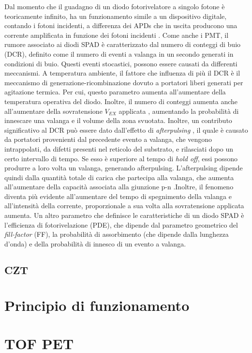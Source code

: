 Dal momento che il guadagno di un diodo fotorivelatore a singolo fotone è teoricamente infinito, ha un funzionamento simile a un dispositivo digitale, contando i fotoni incidenti, a differenza dei APDs che in uscita producono una corrente amplificata in funzione dei fotoni incidenti \cite{Jiang2019}. Come anche i PMT, il rumore associato ai diodi SPAD è caratterizzato dal numero di conteggi di buio (DCR), definito come il numero di eventi a valanga in un secondo generati in condizioni di buio. Questi eventi stocastici, possono essere causati da differenti meccanismi. A temperatura ambiente, il fattore che influenza di più il DCR è il meccanismo di generazione-ricombinazione dovuto a portatori liberi generati per agitazione termica. Per cui, questo parametro aumenta all'aumentare della temperatura operativa del diodo. Inoltre, il numero di conteggi aumenta anche all'aumentare della sovratensione $V_{EX}$ applicata \cite{DiFranco2002}, aumentando la probabilità di innescare una valanga e il volume della zona svuotata. Inoltre, un contributo significativo al DCR può essere dato dall'effetto di \textit{afterpulsing} \cite{DiFranco2002}, il quale è causato da portatori provenienti dal precedente evento a valanga, che vengono intrappolati, da difetti presenti nel reticolo del substrato, e rilasciati dopo un certo intervallo di tempo. Se esso è superiore al tempo di \textit{hold off}, essi possono produrre a loro volta un valanga, generando afterpulsing. L'afterpulsing dipende quindi dalla quantità totale di carica che partecipa alla valanga, che aumenta all'aumentare della capacità associata alla giunzione p-n \cite{Palubiak2011}.Inoltre, il fenomeno diventa più evidente all'aumentare del tempo di spegnimento della valanga e all'intensità della corrente, proporzionale a sua volta alla sovratensione applicata aumenta. Un altro parametro che definisce le caratteristiche di un diodo SPAD è l'efficienza di fotorivelazione (PDE), che dipende dal parametro geometrico del \textit{fill-factor} (FF), la probabilità di assorbimento (che dipende dalla lunghezza d'onda) e della probabilità di innesco di un evento a valanga.






\clearpage
\subsection{CZT}

\clearpage
\section{Principio di funzionamento}

\clearpage
\section{TOF PET}